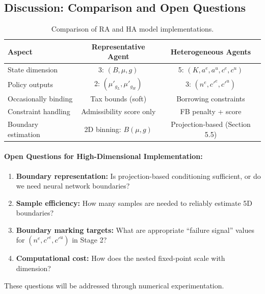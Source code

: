 \subsection{Discussion: Comparison and Open Questions}

\begin{table}[h]
\centering
\begin{tabular}{lcc}
\toprule
\textbf{Aspect} & \textbf{Representative Agent} & \textbf{Heterogeneous Agents} \\
\midrule
State dimension & 3: $(B, \mu, g)$ & 5: $(K, a^e, a^u, c^e, c^u)$ \\
Policy outputs & 2: $(\mu'_{g_L}, \mu'_{g_H})$ & 3: $(n^e, c'^e, c'^u)$ \\
Occasionally binding & Tax bounds (soft) & Borrowing constraints \\
Constraint handling & Admissibility score only & FB penalty + score \\
Boundary estimation & 2D binning: $B(\mu, g)$ & Projection-based (Section 5.5) \\
\bottomrule
\end{tabular}
\caption{Comparison of RA and HA model implementations.}
\label{tab:comparison}
\end{table}

\paragraph{Open Questions for High-Dimensional Implementation:}
\begin{enumerate}
    \item \textbf{Boundary representation:} Is projection-based conditioning sufficient, or do we need neural network boundaries?
    \item \textbf{Sample efficiency:} How many samples are needed to reliably estimate 5D boundaries?
    \item \textbf{Boundary marking targets:} What are appropriate ``failure signal'' values for $(n^e, c'^e, c'^u)$ in Stage 2?
    \item \textbf{Computational cost:} How does the nested fixed-point scale with dimension?
\end{enumerate}

These questions will be addressed through numerical experimentation.

